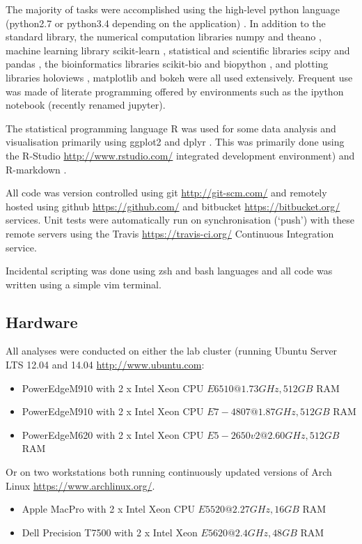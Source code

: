 The majority of tasks were accomplished using the high-level python language (python2.7 or python3.4
depending on the application) \citep{}.  In addition to the standard library, the numerical
computation libraries numpy \citep{} and theano \citep{}, machine learning library scikit-learn \citep{},
statistical and scientific libraries scipy \citep{} and pandas \citep{}, the bioinformatics libraries
scikit-bio \citep{} and biopython \citep{}, and plotting libraries holoviews \citep{}, 
matplotlib \citep{} and bokeh \citep{} were all used extensively.
Frequent use was made of literate programming offered by environments such as the ipython notebook (recently
renamed jupyter).

The statistical programming language R \citep{RCoreTeam2015} was used for some data analysis
and visualisation primarily using ggplot2 \citep{Wickham2009} and dplyr \citep{Wickham2014}.
This was primarily done using the R-Studio \url{http://www.rstudio.com/} integrated development environment) and 
R-markdown \citep{Allaire2014}.

All code was version controlled using git \url{http://git-scm.com/} and remotely hosted using github \url{https://github.com/} and bitbucket \url{https://bitbucket.org/} 
services.  Unit tests were automatically run on synchronisation (`push') with these remote servers using 
the Travis \url{https://travis-ci.org/} Continuous Integration service.

Incidental scripting was done using zsh and bash languages and all code was written using a simple vim terminal.

\subsection{Hardware}

All analyses were conducted on either the lab cluster (running Ubuntu Server LTS 12.04 and 14.04 \url{http://www.ubuntu.com}:
\begin{itemize} 
    \item PowerEdgeM910 with 2 x Intel Xeon CPU \(E6510 @ 1.73GHz, 512GB\) RAM
    \item PowerEdgeM910 with 2 x Intel Xeon CPU \(E7-4807 @ 1.87GHz, 512GB\) RAM
    \item PowerEdgeM620 with 2 x Intel Xeon CPU \(E5-2650 v2 @ 2.60GHz, 512GB\) RAM
\end{itemize}
Or on two workstations both running continuously updated versions of Arch Linux \url{https://www.archlinux.org/}.
\begin{itemize}
    \item Apple MacPro with 2 x Intel Xeon CPU \(E5520 @ 2.27GHz, 16GB\) RAM
    \item Dell Precision T7500 with 2 x Intel Xeon \(E5620 @ 2.4GHz, 48GB\) RAM
\end{itemize}


